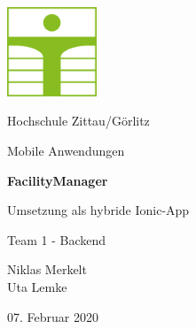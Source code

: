 \documentclass[12pt]{article}
\begin{document}
\begin{titlepage}
	\centering
	\includegraphics[width=0.2\textwidth]{Bilder/hszg}\par
	\vspace{1cm}
	{\LARGE Hochschule Zittau/Görlitz \par}
	\vspace{1cm}
	{\Large Mobile Anwendungen\par}
	\vspace{1.5cm}
	{\huge\bfseries FacilityManager \par}
	\vspace{0.75cm}
	{\LARGE Umsetzung als hybride Ionic-App\par}
	\vspace{2cm}
	{\Large Team 1 - Backend\par}
	\vspace{0.75cm}
	{\Large Niklas Merkelt\\Uta Lemke\par}
	\vfill
	{\large 07. Februar 2020\par}
\end{titlepage}

\tableofcontents
\newpage
\end{document}

